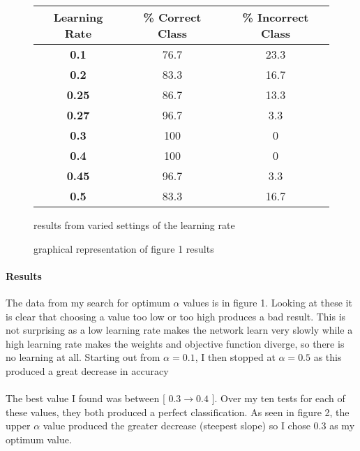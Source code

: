 \documentclass[twocolumn]{article}
\begin{document}
\begin{figure}[h!]
\begin{center}
	\begin{tabular}{ c | c | c  }
	\textbf{Learning Rate}  & \% Correct Class & \% Incorrect Class\\ \hline
         \textbf{0.1} & 76.7 & 23.3  \\ \hline
         \textbf{0.2} & 83.3 & 16.7  \\ \hline
          \textbf{0.25} & 86.7 & 13.3  \\ \hline
          \textbf{0.27} & 96.7 & 3.3  \\ \hline
         \textbf{0.3} & 100 & 0  \\ \hline
         \textbf{0.4} & 100 & 0  \\ \hline
          \textbf{0.45} & 96.7 & 3.3  \\ \hline
         \textbf{0.5} & 83.3 & 16.7  \\ \hline
	\end{tabular}
	\caption{results from varied settings of the learning rate}
\end{center}

\begin{center}
\caption{graphical representation of figure 1 results}
\end{center}
\end{figure}
\paragraph{Results}
The data from my search for optimum $\alpha$ values is in figure 1. Looking at these it is clear that choosing a value too low or too high produces a bad result. This is
not surprising as a low learning rate makes the network learn very slowly while a high learning rate makes the weights and objective function diverge, so there is no learning 
at all. Starting out from $\alpha = 0.1$, I then stopped at $\alpha = 0.5$ as this produced a great decrease in accuracy\\\\
The best value I found was between [ $0.3 \rightarrow 0.4$ ]. Over my ten tests for each of these values, they both produced a perfect classification. As seen in figure 2, the upper 
$\alpha$ value produced the greater decrease (steepest slope) so I chose 0.3 as my optimum value.
\end{document}
